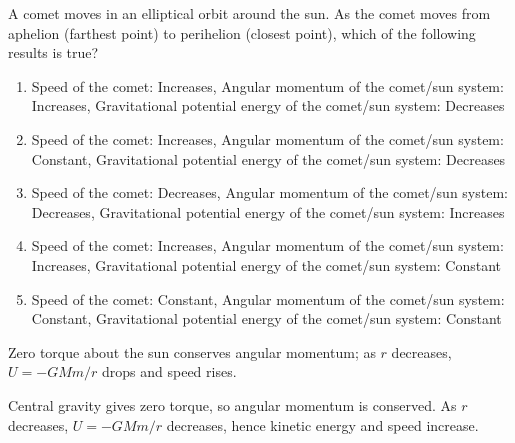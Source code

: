 \item \label{prob:17}
A comet moves in an elliptical orbit around the sun. As the comet moves from aphelion (farthest point) to perihelion (closest point), which of the following results is true?
\begin{enumerate}[label=(\Alph*)]
    \item Speed of the comet: Increases, Angular momentum of the comet/sun system: Increases, Gravitational potential energy of the comet/sun system: Decreases
    \item Speed of the comet: Increases, Angular momentum of the comet/sun system: Constant, Gravitational potential energy of the comet/sun system: Decreases
    \item Speed of the comet: Decreases, Angular momentum of the comet/sun system: Decreases, Gravitational potential energy of the comet/sun system: Increases
    \item Speed of the comet: Increases, Angular momentum of the comet/sun system: Increases, Gravitational potential energy of the comet/sun system: Constant
    \item Speed of the comet: Constant, Angular momentum of the comet/sun system: Constant, Gravitational potential energy of the comet/sun system: Constant
\end{enumerate}

\begin{answerbox}
\end{answerbox}
\begin{insightbox}
Zero torque about the sun conserves angular momentum; as $r$ decreases, $U=-GMm/r$ drops and speed rises.
\end{insightbox}
\begin{solutionbox}

Central gravity gives zero torque, so angular momentum is conserved. As $r$ decreases, $U=-GMm/r$ decreases, hence kinetic energy and speed increase.
\end{solutionbox}


